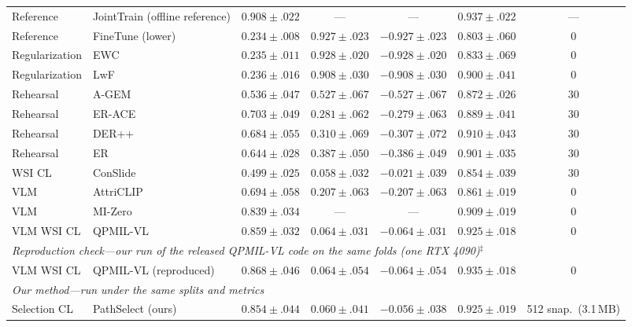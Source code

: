 \documentclass{article}
\begin{document}
\begin{table}[t]
\begin{tabular}{llccccc}
Reference & JointTrain (offline reference) & $0.908{\pm}.022$ & --- & --- & $0.937{\pm}.022$ & --- \\
Reference & FineTune (lower) & $0.234{\pm}.008$ & $0.927{\pm}.023$ & $-0.927{\pm}.023$ & $0.803{\pm}.060$ & 0 \\
Regularization & EWC \cite{kirkpatrick2017ewc} & $0.235{\pm}.011$ & $0.928{\pm}.020$ & $-0.928{\pm}.020$ & $0.833{\pm}.069$ & 0 \\
Regularization & LwF \cite{li2017lwf} & $0.236{\pm}.016$ & $0.908{\pm}.030$ & $-0.908{\pm}.030$ & $0.900{\pm}.041$ & 0 \\
Rehearsal & A-GEM \cite{chaudhry2019agem} & $0.536{\pm}.047$ & $0.527{\pm}.067$ & $-0.527{\pm}.067$ & $0.872{\pm}.026$ & 30 \\
Rehearsal & ER-ACE \cite{caccia2022erace} & $0.703{\pm}.049$ & $0.281{\pm}.062$ & $-0.279{\pm}.063$ & $0.889{\pm}.041$ & 30 \\
Rehearsal & DER++ \cite{buzzega2020derpp} & $0.684{\pm}.055$ & $0.310{\pm}.069$ & $-0.307{\pm}.072$ & $0.910{\pm}.043$ & 30 \\
Rehearsal & ER \cite{chaudhry2019er} & $0.644{\pm}.028$ & $0.387{\pm}.050$ & $-0.386{\pm}.049$ & $0.901{\pm}.035$ & 30 \\
WSI CL & ConSlide \cite{huang2023conslide} & $0.499{\pm}.025$ & $0.058{\pm}.032$ & $-0.021{\pm}.039$ & $0.854{\pm}.039$ & 30 \\
VLM & AttriCLIP \cite{wang2023attriclip} & $0.694{\pm}.058$ & $0.207{\pm}.063$ & $-0.207{\pm}.063$ & $0.861{\pm}.019$ & 0 \\
VLM & MI-Zero \cite{lu2023mizero} & $0.839{\pm}.034$ & --- & --- & $0.909{\pm}.019$ & 0 \\
VLM WSI CL & QPMIL-VL \cite{gou2025qpmil} & $0.859{\pm}.032$ & $0.064{\pm}.031$ & $-0.064{\pm}.031$ & $0.925{\pm}.018$ & 0 \\
\midrule
\multicolumn{7}{l}{\emph{Reproduction check---our run of the released QPMIL-VL code on the same folds (one RTX 4090)$^\ddagger$}} \\
VLM WSI CL & QPMIL-VL (reproduced) & $0.868{\pm}.046$ & $0.064{\pm}.054$ & $-0.064{\pm}.054$ & $0.935{\pm}.018$ & 0 \\
\midrule
\multicolumn{7}{l}{\emph{Our method---run under the same splits and metrics}} \\
Selection CL & PathSelect (ours) & $0.854{\pm}.044$ & $0.060{\pm}.041$ & $-0.056{\pm}.038$ & $0.925{\pm}.019$ & 512 snap.\ (3.1\,MB) \\
\bottomrule
\end{tabular}
\end{table}
\end{document}
